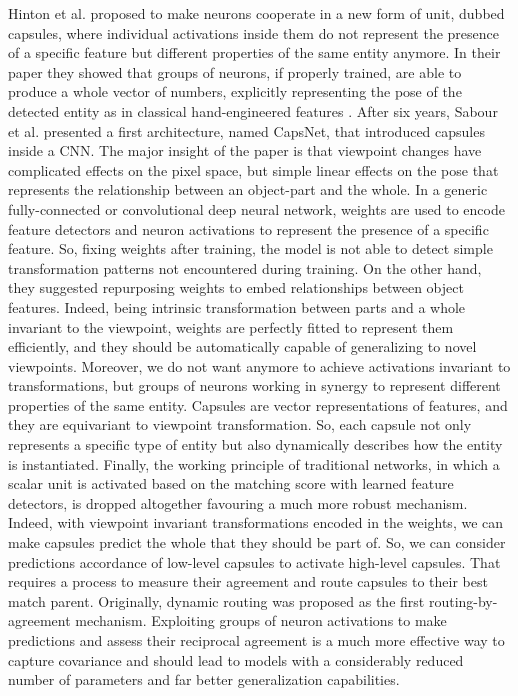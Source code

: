 \documentclass{article}
\begin{document}
Hinton et al. \cite{hinton2011transforming} proposed to make neurons cooperate in a new form of unit, dubbed capsules, where individual activations inside them do not represent the presence of a specific feature but different properties of the same entity anymore. In their paper they showed that groups of neurons, if properly trained, are able to produce a whole vector of numbers, explicitly representing the pose of the detected entity as in classical hand-engineered features \cite{lowe1999object}. After six years, Sabour et al. \cite{sabour2017dynamic} presented a first architecture, named CapsNet, that introduced capsules inside a CNN. The major insight of the paper is that viewpoint changes have complicated effects on the pixel space, but simple linear effects on the pose that represents the relationship between an object-part and the whole. In a generic fully-connected or convolutional deep neural network, weights are used to encode feature detectors and neuron activations to represent the presence of a specific feature. So, fixing weights after training, the model is not able to detect simple transformation patterns not encountered during training. On the other hand, they suggested repurposing weights to embed relationships between object features. Indeed, being intrinsic transformation between parts and a whole invariant to the viewpoint, weights are perfectly fitted to represent them efficiently, and they should be automatically capable of generalizing to novel viewpoints. Moreover, we do not want anymore to achieve activations invariant to transformations, but groups of neurons working in synergy to represent different properties of the same entity. Capsules are vector representations of features, and they are equivariant to viewpoint transformation. So, each capsule not only represents a specific type of entity but also dynamically describes how the entity is instantiated. Finally, the working principle of traditional networks, in which a scalar unit is activated based on the matching score with learned feature detectors, is dropped altogether favouring a much more robust mechanism. Indeed, with viewpoint invariant transformations encoded in the weights, we can make capsules predict the whole that they should be part of. So, we can consider predictions accordance of low-level capsules to activate high-level capsules. That requires a process to measure their agreement and route capsules to their best match parent. Originally, dynamic routing was proposed as the first routing-by-agreement mechanism.  Exploiting groups of neuron activations to make predictions and assess their reciprocal agreement is a much more effective way to capture covariance and should lead to models with a considerably reduced number of parameters and far better generalization capabilities.
\end{document}
